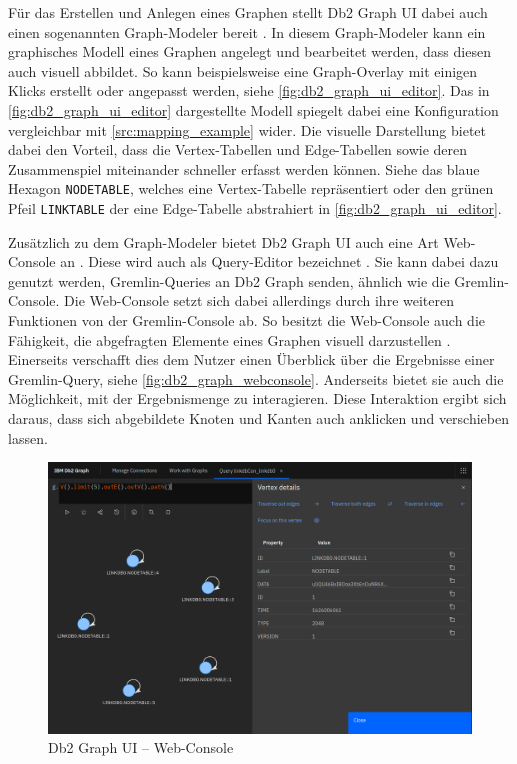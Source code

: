 Für das Erstellen und Anlegen eines Graphen stellt Db2 Graph UI dabei auch einen sogenannten Graph-Modeler bereit \cite{ibm_docs_db2_graph_ui}. In diesem Graph-Modeler kann ein graphisches Modell eines Graphen angelegt und bearbeitet werden, dass diesen auch visuell abbildet. So kann beispielsweise eine Graph-Overlay mit einigen Klicks erstellt oder angepasst werden, siehe \autoref{fig:db2_graph_ui_editor}. Das in \autoref{fig:db2_graph_ui_editor} dargestellte Modell spiegelt dabei eine Konfiguration vergleichbar mit \autoref{src:mapping_example} wider. Die visuelle Darstellung bietet dabei den Vorteil, dass die Vertex-Tabellen und Edge-Tabellen sowie deren Zusammenspiel miteinander schneller erfasst werden können. Siehe das blaue Hexagon \texttt{NODETABLE}, welches eine Vertex-Tabelle repräsentiert oder den grünen Pfeil \texttt{LINKTABLE} der eine Edge-Tabelle abstrahiert in \autoref{fig:db2_graph_ui_editor}.

Zusätzlich zu dem Graph-Modeler bietet Db2 Graph UI auch eine Art Web-Console an \cite{ibm_docs_db2_graph_ui}. Diese wird auch als Query-Editor bezeichnet \cite{ibm_docs_db2_graph_ui}. Sie kann dabei dazu genutzt werden, Gremlin-Queries an Db2 Graph senden, ähnlich wie die Gremlin-Console. Die Web-Console setzt sich dabei allerdings durch ihre weiteren Funktionen von der Gremlin-Console ab. So besitzt die Web-Console auch die Fähigkeit, die abgefragten Elemente eines Graphen visuell darzustellen \cite{ibm_docs_db2_graph_ui}. Einerseits verschafft dies dem Nutzer einen Überblick über die Ergebnisse einer Gremlin-Query, siehe \autoref{fig:db2_graph_webconsole}. Anderseits bietet sie auch die Möglichkeit, mit der Ergebnismenge zu interagieren. Diese Interaktion ergibt sich daraus, dass sich abgebildete Knoten und Kanten auch anklicken und verschieben lassen.

\begin{figure}[ht]
    \centering
    \includegraphics[width=\textwidth]{images/db2_graph_webconsole.png}
    \vspace{0.1em}
    \caption[Db2 Graph UI -- Web-Console]{Db2 Graph UI -- Web-Console}
    \label{fig:db2_graph_webconsole}
\end{figure}


